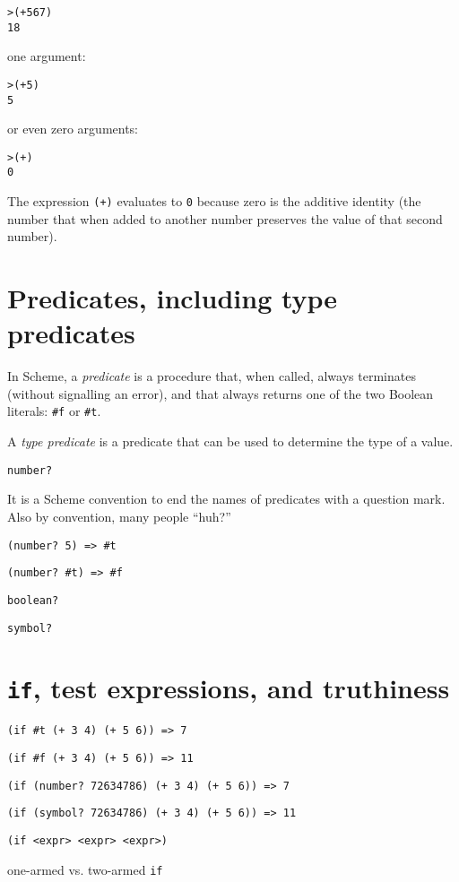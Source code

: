 \documentclass{book}
\begin{document}
\begin{alltt}
> (+ 5 6 7)
18
\end{alltt}

\noindent
one argument:

\begin{alltt}
> (+ 5)
5
\end{alltt}

\noindent
or even zero arguments:

\begin{alltt}
> (+)
0
\end{alltt}

The expression \verb|(+)| evaluates to \verb|0| because zero is the additive identity (the number that when added to another number preserves the value of that second number).

\section{Predicates, including type predicates}

In Scheme, a \emph{predicate} is a procedure that, when called, always terminates (without signalling an error), and that always returns one of the two Boolean literals: \verb|#f| or \verb|#t|.

A \emph{type predicate} is a predicate that can be used to determine the type of a value.

\verb|number?|

It is a Scheme convention to end the names of predicates with a question mark.
Also by convention, many people ``huh?'' 

\verb|(number? 5) => #t|

\verb|(number? #t) => #f|

\verb|boolean?|

\verb|symbol?|

\section{\texttt{if}, test expressions, and truthiness}

\verb|(if #t (+ 3 4) (+ 5 6)) => 7|

\verb|(if #f (+ 3 4) (+ 5 6)) => 11|

\verb|(if (number? 72634786) (+ 3 4) (+ 5 6)) => 7|

\verb|(if (symbol? 72634786) (+ 3 4) (+ 5 6)) => 11|

\verb|(if <expr> <expr> <expr>)|

one-armed vs. two-armed \verb|if|
\end{document}
